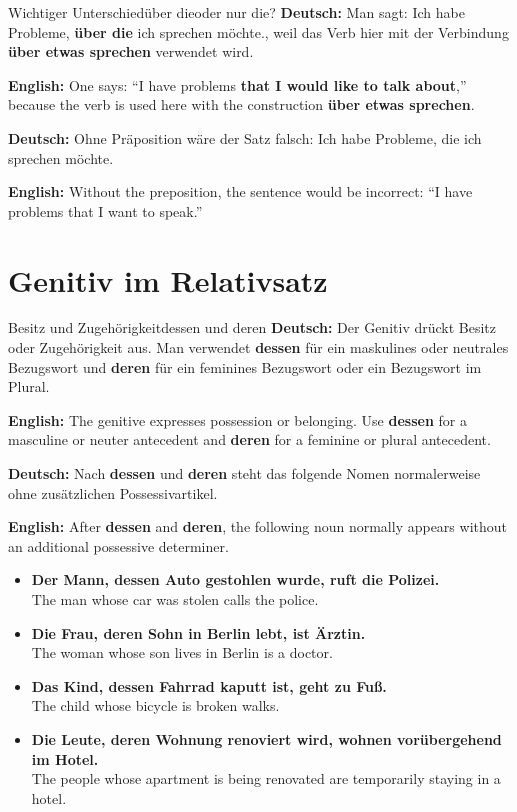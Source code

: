 \documentclass[a4paper,11pt]{article}
\newcommand{\GermanText}[1]{\textbf{Deutsch: }#1\par}
\newcommand{\EnglishText}[1]{{\small\color{SoftGray}\textbf{English: }#1\par}}
\newcommand{\ExampleItem}[2]{\item \textbf{#1}\\{\small\color{SoftGray}#2}}
\begin{document}
        \begin{grammarentry}{Wichtiger Unterschied}{\glqq über die\grqq oder nur \glqq die\grqq?}
            \GermanText{Man sagt: \glqq Ich habe Probleme, \textbf{über die} ich sprechen möchte.\grqq, weil das Verb hier mit der Verbindung \textbf{über etwas sprechen} verwendet wird.}
            \EnglishText{One says: ``I have problems \textbf{that I would like to talk about},'' because the verb is used here with the construction \textbf{über etwas sprechen}.}

            \GermanText{Ohne Präposition wäre der Satz falsch: \glqq Ich habe Probleme, die ich sprechen möchte.\grqq}
            \EnglishText{Without the preposition, the sentence would be incorrect: ``I have problems that I want to speak.''}
        \end{grammarentry}

    \section{Genitiv im Relativsatz}

        \begin{grammarentry}{Besitz und Zugehörigkeit}{dessen und deren}
            \GermanText{Der Genitiv drückt Besitz oder Zugehörigkeit aus. Man verwendet \textbf{dessen} für ein maskulines oder neutrales Bezugswort und \textbf{deren} für ein feminines Bezugswort oder ein Bezugswort im Plural.}
            \EnglishText{The genitive expresses possession or belonging. Use \textbf{dessen} for a masculine or neuter antecedent and \textbf{deren} for a feminine or plural antecedent.}

            \GermanText{Nach \textbf{dessen} und \textbf{deren} steht das folgende Nomen normalerweise ohne zusätzlichen Possessivartikel.}
            \EnglishText{After \textbf{dessen} and \textbf{deren}, the following noun normally appears without an additional possessive determiner.}
        \end{grammarentry}

        \begin{exbox}
            \begin{itemize}
                \ExampleItem{Der Mann, dessen Auto gestohlen wurde, ruft die Polizei.}{The man whose car was stolen calls the police.}
                \ExampleItem{Die Frau, deren Sohn in Berlin lebt, ist Ärztin.}{The woman whose son lives in Berlin is a doctor.}
                \ExampleItem{Das Kind, dessen Fahrrad kaputt ist, geht zu Fuß.}{The child whose bicycle is broken walks.}
                \ExampleItem{Die Leute, deren Wohnung renoviert wird, wohnen vorübergehend im Hotel.}{The people whose apartment is being renovated are temporarily staying in a hotel.}
            \end{itemize}
        \end{exbox}
\end{document}

